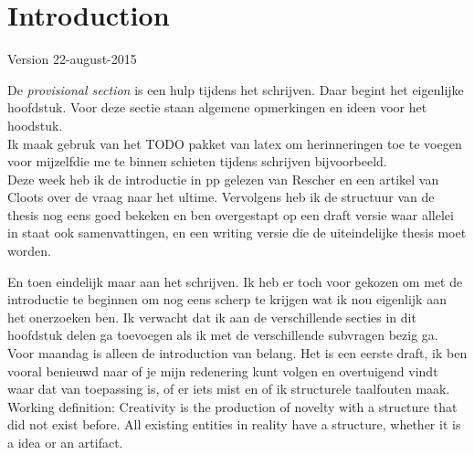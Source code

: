 \chapter{Introduction}

Version 22-august-2015


De \textit{provisional section} is een hulp tijdens het schrijven. Daar begint het eigenlijke hoofdstuk. Voor deze sectie staan algemene opmerkingen en ideen voor het hoodstuk.\\


Ik maak gebruk van het TODO pakket van latex om herinneringen toe te voegen voor mijzelfdie me te binnen schieten tijdens schrijven bijvoorbeeld.\\


Deze week heb ik de introductie in pp gelezen van Rescher en een artikel van Cloots over de vraag naar het ultime. Vervolgens heb ik de structuur van de thesis nog eens goed bekeken en ben overgestapt op een draft versie waar allelei in staat ook samenvattingen, en een writing versie die de uiteindelijke thesis moet worden.

En toen eindelijk maar aan het schrijven. Ik heb er toch voor gekozen om met de introductie te beginnen om nog eens scherp te krijgen wat ik nou eigenlijk aan het onerzoeken ben. Ik verwacht dat ik aan de verschillende secties in dit hoofdstuk delen ga toevoegen als ik met de verschillende subvragen bezig ga.
Voor maandag is alleen de introduction van belang. Het is een eerste draft, ik ben vooral benieuwd naar of je mijn redenering kunt volgen en overtuigend vindt waar dat van toepassing is, of er iets mist en of ik structurele taalfouten maak.\\


Working definition:
Creativity is the production of novelty with a structure that did not exist before.
All existing entities in reality have a structure, whether it is a idea or an artifact.

